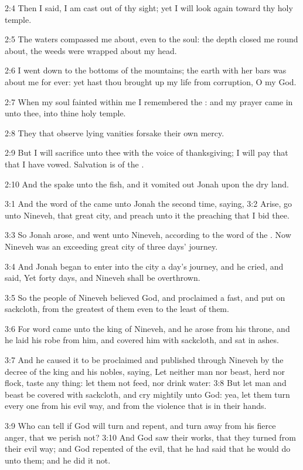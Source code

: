 2:4 Then I said, I am cast out of thy sight; yet I will look again toward thy holy temple.

2:5 The waters compassed me about, even to the soul: the depth closed me round about, the weeds were wrapped about my head.

2:6 I went down to the bottoms of the mountains; the earth with her bars was about me for ever: yet hast thou brought up my life from corruption, O \LORD my God.

2:7 When my soul fainted within me I remembered the \LORD: and my prayer came in unto thee, into thine holy temple.

2:8 They that observe lying vanities forsake their own mercy.

2:9 But I will sacrifice unto thee with the voice of thanksgiving; I will pay that that I have vowed. Salvation is of the \LORD.

2:10 And the \LORD spake unto the fish, and it vomited out Jonah upon the dry land.

3:1 And the word of the \LORD came unto Jonah the second time, saying, 3:2 Arise, go unto Nineveh, that great city, and preach unto it the preaching that I bid thee.

3:3 So Jonah arose, and went unto Nineveh, according to the word of the \LORD. Now Nineveh was an exceeding great city of three days' journey.

3:4 And Jonah began to enter into the city a day's journey, and he cried, and said, Yet forty days, and Nineveh shall be overthrown.

3:5 So the people of Nineveh believed God, and proclaimed a fast, and put on sackcloth, from the greatest of them even to the least of them.

3:6 For word came unto the king of Nineveh, and he arose from his throne, and he laid his robe from him, and covered him with sackcloth, and sat in ashes.

3:7 And he caused it to be proclaimed and published through Nineveh by the decree of the king and his nobles, saying, Let neither man nor beast, herd nor flock, taste any thing: let them not feed, nor drink water: 3:8 But let man and beast be covered with sackcloth, and cry mightily unto God: yea, let them turn every one from his evil way, and from the violence that is in their hands.

3:9 Who can tell if God will turn and repent, and turn away from his fierce anger, that we perish not?  3:10 And God saw their works, that they turned from their evil way; and God repented of the evil, that he had said that he would do unto them; and he did it not.


